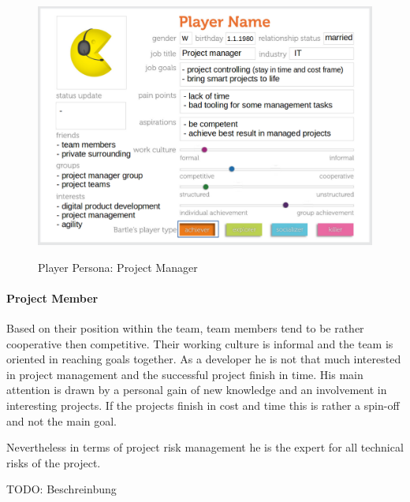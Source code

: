 \begin{figure}[H]
	\centering
	\includegraphics[width=1.0\textwidth]{Content/Domain/PersonaProjectManager.png}
	\caption{Player Persona: Project Manager}
	\label{fig:personaProjectManager}
	\cite[p. 88; adapted]{kumarGamificationWorkDesigning2013}
\end{figure}

\paragraph*{Project Member}

Based on their position within the team, team members tend to be rather cooperative then competitive. Their working culture is informal and the team is oriented in reaching goals together. As a developer he is not that much interested in project management and the successful project finish in time. His main attention is drawn by a personal gain of new knowledge and an involvement in interesting projects. If the projects finish in cost and time this is rather a spin-off and not the main goal.

Nevertheless in terms of project risk management he is the expert for all technical risks of the project.

TODO: Beschreinbung

